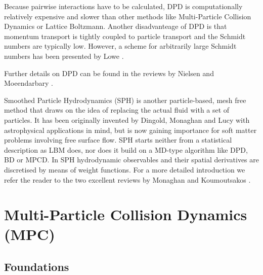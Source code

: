 \documentclass[8.5pt,twoside,twocolumn]{article}
\begin{document}
Because pairwise interactions have to be calculated, DPD is computationally relatively expensive and  
slower than other methods like Multi-Particle Collision Dynamics or Lattice Boltzmann.
Another disadvanteage of DPD is that momentum transport is tightly coupled to particle transport and the Schmidt numbers 
are typically low. However, a scheme for arbitrarily large Schmidt numbers has been presented by Lowe \cite{Lowe:2004}.

Further details on DPD can be found in the reviews by Nielsen \cite{Nielsen:2004} and 
Moeendarbary \cite{Moeendarbary:2009, Moeendarbary:2010}.


Smoothed Particle Hydrodynamics (SPH) is another particle-based, mesh free method
that draws on the idea of replacing the actual fluid with a set of particles.
It has been originally invented by Dingold, Monaghan and Lucy
with astrophysical applications in mind, but is now gaining importance for soft matter
problems involving free surface flow.
SPH starts neither from a statistical description as LBM does, nor does it
build on a MD-type algorithm like DPD, BD or MPCD. In SPH hydrodynamic observables 
and their spatial derivatives are discretised by means of 
weight functions. For a more detailed introduction we refer the reader to the two
excellent reviews by Monaghan \cite{Monaghan:2012} and Koumoutsakos \cite{Koumoutsakos:2005}.


\section{Multi-Particle Collision Dynamics (MPC)}

\subsection{Foundations}
\end{document}
